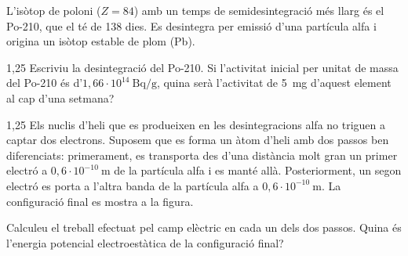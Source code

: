 L'isòtop de poloni ($Z = 84$) amb un temps de semidesintegració més llarg és el Po-210, que el té de 138 dies. Es desintegra per emissió d'una partícula alfa i origina un isòtop estable de plom (Pb).

\begin{apartat}{1,25}
Escriviu la desintegració del Po-210. Si l'activitat inicial per unitat de massa del Po-210 és d'$1,66\cdot 10^{14}\ \mathrm{Bq/g}$, quina serà l'activitat de 5~mg d'aquest element al cap d'una setmana?
\end{apartat}

\begin{apartat}{1,25}
Els nuclis d'heli que es produeixen en les desintegracions alfa no triguen a captar dos electrons. Suposem que es forma un àtom d'heli amb dos passos ben diferenciats: primerament, es transporta des d'una distància molt gran un primer electró a $0,6\cdot 10^{-10}\ \mathrm{m}$ de la partícula alfa i es manté allà. Posteriorment, un segon electró es porta a l'altra banda de la partícula alfa a $0,6\cdot 10^{-10}\ \mathrm{m}$. La configuració final es mostra a la figura.


Calculeu el treball efectuat pel camp elèctric en cada un dels dos passos. Quina és l'energia potencial electroestàtica de la configuració final?
\end{apartat}

